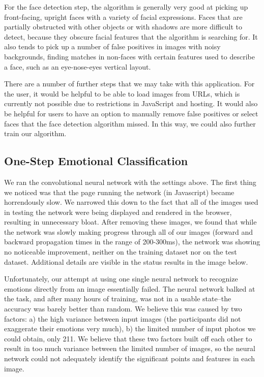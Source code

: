 \documentclass[10pt,twocolumn,letterpaper]{article}
\begin{document}
For the face detection step, the algorithm is generally very good at picking up front-facing, upright faces with a variety of facial expressions. Faces that are partially obstructed with other objects or with shadows are more difficult to detect, because they obscure facial features that the algorithm is searching for. It also tends to pick up a number of false positives in images with noisy backgrounds, finding matches in non-faces with certain features used to describe a face, such as an eye-nose-eyes vertical layout.

There are a number of further steps that we may take with this application. For the user, it would be helpful to be able to load images from URLs, which is currently not possible due to restrictions in JavaScript and hosting. It would also be helpful for users to have an option to manually remove false positives or select faces that the face detection algorithm missed. In this way, we could also further train our algorithm.

\subsection{One-Step Emotional Classification}

We ran the convolutional neural network with the settings above. The first thing we noticed was that the page running the network (in Javascript) became horrendously slow. We narrowed this down to the fact that all of the images used in testing the network were being displayed and rendered in the browser, resulting in unnecessary bloat. After removing these images, we found that while the network was slowly making progress through all of our images (forward and backward propagation times in the range of 200-300ms), the network was showing no noticeable improvement, neither on the training dataset nor on the test dataset. Additional details are visible in the status results in the image below.

Unfortunately, our attempt at using one single neural network to recognize emotions directly from an image essentially failed. The neural network balked at the task, and after many hours of training, was not in a usable state--the accuracy was barely better than random. We believe this was caused by two factors: a) the high variance between input images (the participants did not exaggerate their emotions very much), b) the limited number of input photos we could obtain, only 211. We believe that these two factors built off each other to result in too much variance between the limited number of images, so the neural network could not adequately identify the significant points and features in each image.
\end{document}
